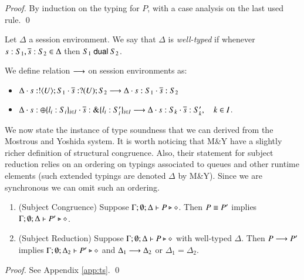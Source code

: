 \begin{proof}
By induction on the typing for $P$, with a case analysis on the last used rule. 
\qed
\end{proof}

\begin{definition}\rm
	Let $\Delta$ a session environment.
	We say that $\Delta$ is {\em well-typed} if whenever
	$s: S_1, \overline{s}: S_2 \in \Delta$ then $S_1 \ \mathsf{dual}\  S_2$.
\end{definition}

\begin{definition}\rm
	We define relation $\longrightarrow$ on session environments as:
	\begin{itemize}
		\item	$\Delta \cdot s: ! \langle U \rangle ; S_1 \cdot \overline{s}: ? (U) ; S_2 \longrightarrow \Delta \cdot s: S_1 \cdot \overline{s}: S_2$
		\item	$\Delta \cdot s: \oplus \{l_i: S_i\}_{i \in I} \cdot \overline{s}: \& \{l_i: S_i'\}_{i \in I} \longrightarrow \Delta \cdot s: S_k \cdot \overline{s}: S_k', \quad k \in I$.
	\end{itemize}
\end{definition}

We now state the instance of type soundness that we can derived from the Mostrous and Yoshida system.
It is worth noticing that M\&Y have a slightly richer definition of structural congruence.
Also, their statement for subject reduction relies on an ordering on typings associated to queues and other 
runtime elements (such extended typings are denoted $\Delta$ by M\&Y).
Since we are synchronous we can omit such an ordering.

\begin{theorem}\label{t:sr}\rm
	\begin{enumerate}[1.]
		\item	(Subject Congruence) Suppose $\Gamma; \emptyset; \Delta \vdash P \triangleright \diamond$.
			Then $P \equiv P'$ implies $\Gamma; \emptyset; \Delta \vdash P' \triangleright \diamond$.

		\item	(Subject Reduction) Suppose $\Gamma; \emptyset; \Delta \vdash P \triangleright \diamond$
			with
			well-typed $\Delta$.
			Then $P \longrightarrow P'$ implies $\Gamma; \emptyset; \Delta_2  \vdash P' \triangleright \diamond$
			and $\Delta_1 \longrightarrow \Delta_2$ or $\Delta_1 = \Delta_2$.
	\end{enumerate}
\end{theorem}

\begin{proof}
	See Appendix \ref{app:ts}.
	\qed
\end{proof}
